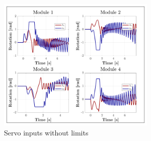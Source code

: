 \begin{figure}[hbtp]
\vspace{-8pt}
\centering
\includegraphics[width=0.67\textwidth]{graphs/saturated-servos}
\vspace{-6pt}
\caption{Servo inputs without limits}
\label{fig:saturated-servos}
\end{figure}
